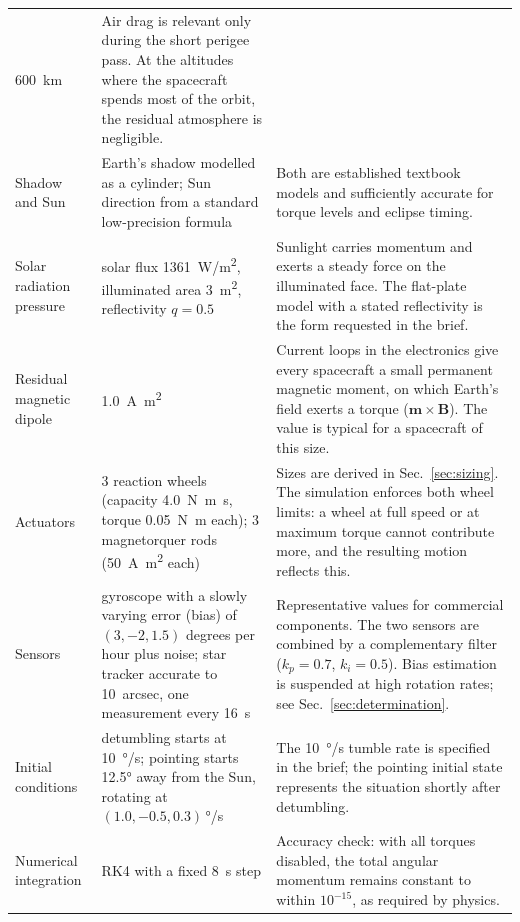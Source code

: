 \documentclass[11pt,a4paper]{article}
\begin{document}
\begin{small}
\begin{longtable}{@{}L{2.9cm}L{5.2cm}L{6.9cm}@{}}
  \SI{600}{km} &
  Air drag is relevant only during the short perigee pass. At the
  altitudes where the spacecraft spends most of the orbit, the residual
  atmosphere is negligible.\\
Shadow and Sun &
  Earth's shadow modelled as a cylinder; Sun direction from a standard
  low-precision formula &
  Both are established textbook models and sufficiently accurate for
  torque levels and eclipse timing.\\
Solar radiation pressure &
  solar flux \SI{1361}{W/m^2}, illuminated area \SI{3}{m^2},
  reflectivity \(q=0.5\) &
  Sunlight carries momentum and exerts a steady force on the illuminated
  face. The flat-plate model with a stated reflectivity is the form
  requested in the brief.\\
Residual magnetic dipole &
  \SI{1.0}{A.m^2} &
  Current loops in the electronics give every spacecraft a small
  permanent magnetic moment, on which Earth's field exerts a torque
  (\(\mathbf m \times \mathbf B\)). The value is typical for a spacecraft
  of this size.\\
Actuators &
  3 reaction wheels (capacity \SI{4.0}{N.m.s}, torque \SI{0.05}{N.m}
  each); 3 magnetorquer rods (\SI{50}{A.m^2} each) &
  Sizes are derived in Sec.~\ref{sec:sizing}. The simulation enforces
  both wheel limits: a wheel at full speed or at maximum torque cannot
  contribute more, and the resulting motion reflects this.\\
Sensors &
  gyroscope with a slowly varying error (bias) of \((3,-2,1.5)\) degrees
  per hour plus noise; star tracker accurate to \SI{10}{arcsec}, one
  measurement every \SI{16}{s} &
  Representative values for commercial components. The two sensors are
  combined by a complementary filter (\(k_p=0.7\), \(k_i=0.5\)). Bias
  estimation is suspended at high rotation rates; see
  Sec.~\ref{sec:determination}.\\
Initial conditions &
  detumbling starts at \SI{10}{\degree/s}; pointing starts \ang{12.5}
  away from the Sun, rotating at \((1.0,-0.5,0.3)\)\,\si{\degree/s} &
  The \SI{10}{\degree/s} tumble rate is specified in the brief; the
  pointing initial state represents the situation shortly after
  detumbling.\\
Numerical integration &
  RK4 with a fixed \SI{8}{s} step &
  Accuracy check: with all torques disabled, the total angular momentum
  remains constant to within \(10^{-15}\), as required by physics.\\
\end{longtable}
\end{small}
\end{document}
